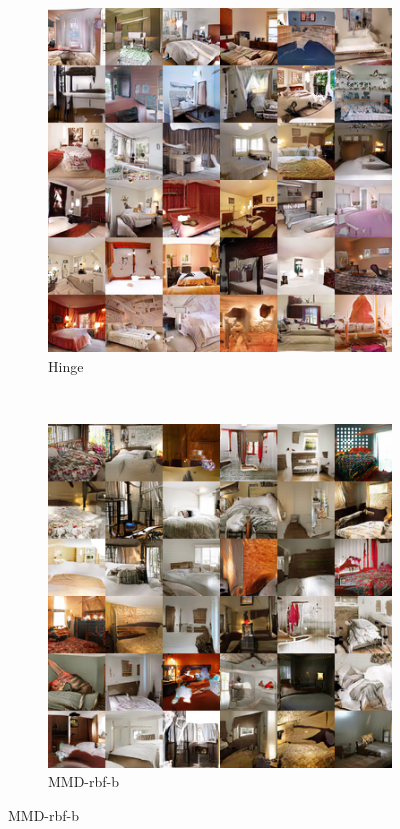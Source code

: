 \documentclass{article} %
\theoremstyle{plain}
\newtheorem*{proposition 1*}{Proposition 1}
\begin{document}
\begin{appendices}
\begin{figure}[tb]
	\begin{subfigure}[t]{0.45\linewidth}
		\centering
		\includegraphics[width=1\textwidth]{lsun_hinge.png}
		\caption{Hinge\label{fig:sample_lsun_hinge}}
	\end{subfigure}
	~
	\begin{subfigure}[t]{0.45\linewidth}
		\centering
		\includegraphics[width=1\textwidth]{lsun_mgb.png}
		\caption{MMD-rbf-b\label{fig:sample_lsun_mgb}}
	\end{subfigure}


\end{figure}
\end{appendices}
\end{document}
